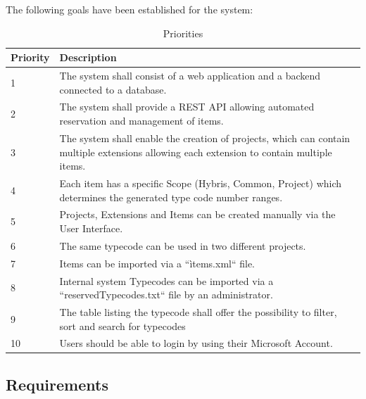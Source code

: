 \newpage
The following goals have been established for the system:

\begin{table}[h]
\centering
\begin{tabular}{|l|p{}|}
\hline
\textbf{Priority} & \textbf{Description} \\ \hline
1 & The system shall consist of a web application and a backend connected to a database. \\ \hline
2 & The system shall provide a REST API allowing automated reservation and management of items. \\ \hline
3 & The system shall enable the creation of projects, which can contain multiple extensions allowing each extension to contain multiple items. \\ \hline
4 & Each item has a specific Scope (Hybris, Common, Project) which determines the generated type code number ranges. \\ \hline
5 & Projects, Extensions and Items can be created manually via the User Interface. \\ \hline
6 & The same typecode can be used in two different projects. \\ \hline
7 & Items can be imported via a ``ìtems.xml`` file. \\ \hline
8 & Internal system Typecodes can be imported via a ``reservedTypecodes.txt`` file by an administrator. \\ \hline
9 & The table listing the typecode shall offer the possibility to filter, sort and search for typecodes \\ \hline
10 & Users should be able to login by using their Microsoft Account. \\ \hline
\end{tabular}
\caption{Priorities}
\label{tab:priority-description}
\end{table}

\subsection{Requirements}\label{subsec:quality-objective}

